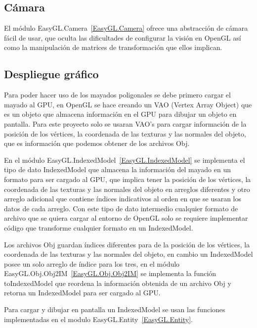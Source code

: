 \subsection{Cámara}

El módulo EasyGL.Camera~\ref{EasyGL.Camera} ofrece una abstracción de cámara fácil de usar, que oculta las dificultades de configurar la visión en OpenGL así como la manipulación de matrices de transformación que ellos implican.

\subsection{Despliegue gráfico}

Para poder hacer uso de los mayados poligonales se debe primero cargar el mayado al GPU, en OpenGL se hace creando un VAO (Vertex Array Object) que es un objeto que almacena información en el GPU para dibujar un objeto en pantalla. Para este proyecto solo se usaran VAO’s para cargar información de la posición de los vértices, la coordenada de las texturas y las normales del objeto, que es información que podemos obtener de los archivos Obj.

En el módulo EasyGL.IndexedModel~\ref{EasyGL.IndexedModel} se implementa el tipo de dato IndexedModel que almacena la información del mayado en un formato para ser cargado al GPU, que implica tener la posición de los vértices, la coordenada de las texturas y las normales del objeto en arreglos diferentes y otro arreglo adicional que contiene índices indicativos al orden en que se usaran los datos de cada arreglo. Con este tipo de dato intermedio cualquier formato de archivo que se quiera cargar al entorno de OpenGL solo se requiere implementar código que transforme cualquier formato en un IndexedModel.

Los archivos Obj guardan índices diferentes para de  la posición de los vértices, la coordenada de las texturas y las normales del objeto, en cambio un IndexedModel posee un solo arreglo de índice para los tres, en el módulo EasyGL.Obj.Obj2IM~\ref{EasyGL.Obj.Obj2IM} se implementa la función toIndexedModel que reordena la información obtenida de un archivo Obj y retorna un IndexedModel para ser cargado al GPU.

Para cargar y dibujar en pantalla un IndexedModel se usan las funciones implementadas en el modulo EasyGL.Entity~\ref{EasyGL.Entity}.



